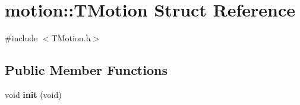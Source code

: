 \hypertarget{structmotion_1_1TMotion}{}\section{motion\+:\+:T\+Motion Struct Reference}
\label{structmotion_1_1TMotion}


{\ttfamily \#include $<$T\+Motion.\+h$>$}

\subsection*{Public Member Functions}
\begin{DoxyCompactItemize}
\item 
\mbox{\label{structmotion_1_1TMotion_a28732b6329e66119a212467bba34cc36}} 
void {\bfseries init} (void)
\end{DoxyCompactItemize}
